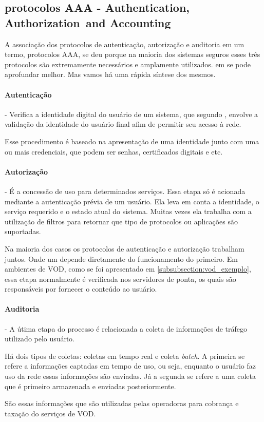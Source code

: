 \subsection{protocolos AAA - Authentication,
Authorization\, and Accounting}
\label{subsection:AAA}
A associa\c{c}\~ao dos protocolos de autentica\c{c}\~ao, autoriza\c{c}\~ao e auditoria em um termo, protocolos AAA, se deu porque na maioria dos sistemas seguros esses tr\^es protocolos s\~ao extremamente necess\'arios e amplamente utilizados. em \cite{metz1999aaa} se pode aprofundar melhor. Mas vamos h\'a uma r\'apida s\'intese dos mesmos.
\paragraph{Autentica\c{c}\~ao}- Verifica a identidade digital do usu\'ario de um sistema, que segundo \cite{metz1999aaa}, envolve a valida\c{c}\~ao da identidade do usu\'ario final afim de permitir seu acesso \`a rede.

Esse procedimento \'e baseado na apresenta\c{c}\~ao de uma identidade junto com uma ou mais credenciais, que podem ser senhas, certificados digitais e etc.
\paragraph{Autoriza\c{c}\~ao}- \'E a concess\~ao de uso para determinados servi\c{c}os. Essa etapa s\'o \'e acionada mediante a autentica\c{c}\~ao pr\'evia de um usu\'ario. Ela leva em conta a identidade, o servi\c{c}o requerido e o estado atual do sistema. Muitas vezes ela trabalha com a utiliza\c{c}\~ao de filtros para retornar que tipo de protocolos ou aplica\c{c}\~oes s\~ao suportadas.

Na maioria dos casos os protocolos de autentica\c{c}\~ao e autoriza\c{c}\~ao trabalham juntos. Onde um depende diretamente do funcionamento do primeiro. Em ambientes de VOD, como se foi apresentado em \ref{subsubsection:vod_exemplo}, essa etapa normalmente \'e verificada nos servidores de ponta, os quais s\~ao respons\'aveis por fornecer o conte\'udo ao usu\'ario.
\paragraph{Auditoria}- A \'utima etapa do processo \'e relacionada a coleta de informa\c{c}\~oes de tr\'afego utilizado pelo usu\'ario. 

H\'a dois tipos de coletas: coletas em tempo real e coleta \textit{batch}. A primeira se refere a informa\c{c}\~oes captadas em tempo de uso, ou seja, enquanto o usu\'ario faz uso da rede essas informa\c{c}\~oes s\~ao enviadas. J\'a a segunda se refere a uma coleta que \'e primeiro armazenada e enviadas posteriormente. 

S\~ao essas informa\c{c}\~oes que s\~ao utilizadas pelas operadoras para cobran\c{c}a e taxa\c{c}\~ao do servi\c{c}os de VOD.